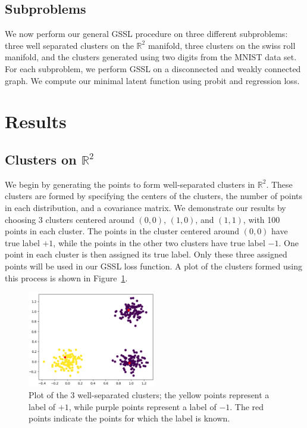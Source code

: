 \documentclass[12pt]{amsart}
\begin{document}
\subsection{Subproblems}

We now perform our general GSSL procedure on three different subproblems: three well separated clusters on the $\mathbb{R}^2$ manifold, three clusters on the swiss roll manifold, and the clusters generated using two digits from the MNIST data set. For each subproblem, we perform GSSL on a disconnected and weakly connected graph. We compute our minimal latent function using probit and regression loss.

\section{Results}

\subsection{Clusters on $\mathbb{R}^2$}\label{Sec:3Clus}

We begin by generating the points to form well-separated clusters in $\mathbb{R}^2$. These clusters are formed by specifying the centers of the clusters, the number of points in each distribution, and a covariance matrix. We demonstrate our results by choosing 3 clusters centered around $(0,0)$, $(1,0)$, and $(1,1)$, with 100 points in each cluster.
The points in the cluster centered around $(0,0)$ have true label $+1$, while the points in the other two clusters have true label $-1$. One point in each cluster is then assigned its true label. Only these three assigned points will be used in our GSSL loss function. A plot of the clusters formed using this process is shown in Figure~\ref{Fig:Dis3ClusOg}.
\begin{figure}
    \centering
    \includegraphics[width=0.5\textwidth]{Figures/Dis3ClusOG.png}
    \caption{
        Plot of the 3 well-separated clusters; the yellow points represent a label of $+1$, while purple points represent a label of $-1$. The red points indicate the points for which the label is known. 
    }
	\label{Fig:Dis3ClusOg}
\end{figure}
\end{document}
